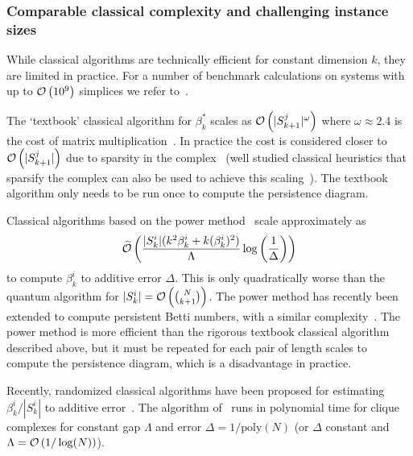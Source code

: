 \begin{refsection}
\subsubsection*{Comparable classical complexity and challenging instance sizes}
While classical algorithms are technically efficient for constant dimension $k$, they are limited in practice. For a number of benchmark calculations on systems with up to $\mathcal{O}\left( 10^9 \right)$ simplices we refer to~\cite{otter2017roadmap}.

The `textbook' classical algorithm for $\beta_k^*$ scales as $\mathcal{O}\left( |S_{k+1}^j|^\omega \right)$ where $\omega \approx 2.4$ is the cost of matrix multiplication~\cite{milosavljevic2011zigzagTDA}. In practice the cost is considered closer to $\mathcal{O}\left( |S_{k+1}^j| \right)$ due to sparsity in the complex~\cite{milosavljevic2011zigzagTDA} (well studied classical heuristics that sparsify the complex can also be used to achieve this scaling~\cite{mischaikow2013morsetheoryTDA}). The textbook algorithm only needs to be run once to compute the persistence diagram.

Classical algorithms based on the power method~\cite{friedman1998computingbetti} scale approximately as
\begin{equation}
    \widetilde{\mathcal{O}}\left( \frac{|S_k^i| (k^2 \beta_k^i + k (\beta_k^i)^2)}{\Lambda} \log\left(\frac{1}{\Delta}\right)   \right)
\end{equation}
to compute $\beta_k^i$ to additive error $\Delta$. This is only quadratically worse than the quantum algorithm for $|S_k^i| = \mathcal{O}\left( \binom{N}{k+1}  \right)$. The power method has recently been extended to compute persistent Betti numbers, with a similar complexity~\cite{mcardle2022streamlinedTDA}. The power method is more efficient than the rigorous textbook classical algorithm described above, but it must be repeated for each pair of length scales to compute the persistence diagram, which is a disadvantage in practice. 

Recently, randomized classical algorithms have been proposed for estimating $\beta_k^i/|S_k^i|$ to additive error~\cite{berry2022quantifyingTDA,apers2022SimpleBetti}. The algorithm of~\cite{apers2022SimpleBetti} runs in polynomial time for clique complexes for constant gap $\Lambda$ and error $\Delta = 1/\mathrm{poly}(N)$ (or $\Delta$ constant and $\Lambda = \mathcal{O}\left( 1/\log(N) \right)$).




\end{refsection}

